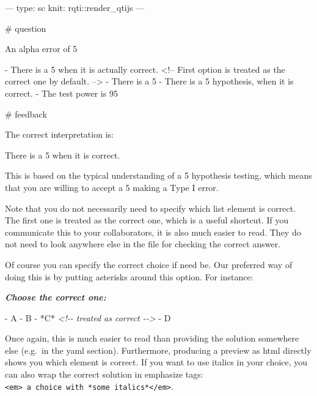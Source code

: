 \documentclass[twoside]{tufte-book}
\newenvironment{Shaded}{}{}
\newcommand{\AnnotationTok}[1]{\textcolor[rgb]{0.38,0.63,0.69}{\textbf{\textit{#1}}}}
\newcommand{\CommentTok}[1]{\textcolor[rgb]{0.38,0.63,0.69}{\textit{#1}}}
\newcommand{\NormalTok}[1]{#1}
\newcommand{\SpecialStringTok}[1]{\textcolor[rgb]{0.73,0.40,0.53}{#1}}
\begin{document}
\begin{Shaded}
\begin{Highlighting}
---
type: sc
knit: rqti::render_qtijs
---

# question

An alpha error of 5% means that:

- There is a 5% probability that you will mistakenly reject the null hypothesis, 
when it is actually correct. <!-- First option is treated as the correct one by 
default. -->
- There is a 5% probability that the null hypothesis is correct.
- There is a 5% probability that you will mistakenly reject the alternative 
hypothesis, when it is correct.
- The test power is 95%.

# feedback

The correct interpretation is:

There is a 5% probability that you will mistakenly reject the null hypothesis, 
when it is correct.

This is based on the typical understanding of a 5% significance level in
hypothesis testing, which means that you are willing to accept a 5% chance of
making a Type I error.
\end{Highlighting}
\end{Shaded}

Note that you do not necessarily need to specify which list element is correct. The first one is treated as the correct one, which is a useful shortcut. If you communicate this to your collaborators, it is also much easier to read. They do not need to look anywhere else in the file for checking the correct answer.

Of course you can specify the correct choice if need be. Our preferred way of doing this is by putting asterisks around this option. For instance:

\begin{Shaded}
\begin{Highlighting}[]
\AnnotationTok{Choose the correct one:}
  
\SpecialStringTok{{-} }\NormalTok{A}
\SpecialStringTok{{-} }\NormalTok{B}
\SpecialStringTok{{-} }\NormalTok{*C* }\CommentTok{\textless{}!{-}{-} treated as correct {-}{-}\textgreater{}}
\SpecialStringTok{{-} }\NormalTok{D}
\end{Highlighting}
\end{Shaded}

Once again, this is much easier to read than providing the solution somewhere else (e.g.~in the yaml section). Furthermore, producing a preview as html directly shows you which element is correct. If you want to use italics in your choice, you can also wrap the correct solution in emphasize tags: \texttt{\textless{}em\textgreater{}\ a\ choice\ with\ *some\ italics*\textless{}/em\textgreater{}}.
\end{document}
